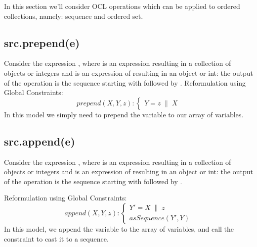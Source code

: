 In this section we'll consider OCL operations which can be applied to ordered collections, namely: sequence and ordered set.

\subsection{src.prepend(e)}
Consider the expression , where  is an expression resulting in a collection of objects or integers and  is an expression of resulting in an object or int: the output of the operation is the sequence starting with  followed by .
Reformulation using Global Constraints:
\begin{equation}\label{csp:prepend}
    prepend(X,Y,z):
    \begin{cases}
        Y = z\;\mathbin{\|}\;X
    \end{cases}
\end{equation}
In this model we simply need to prepend the variable to our array of variables.

\subsection{src.append(e)}
Consider the expression , where  is an expression resulting in a collection of objects or integers and  is an expression of resulting in an object or int: the output of the operation is the sequence starting with  followed by .

Reformulation using Global Constraints:
\begin{equation}\label{csp:append}
    append(X,Y,z):
    \begin{cases}
        Y' = X\;\mathbin{\|}\;z\\
        asSequence(Y',Y)
    \end{cases}
\end{equation}
In this model, we append the variable to the array of variables, and call the constraint to cast it to a sequence.




